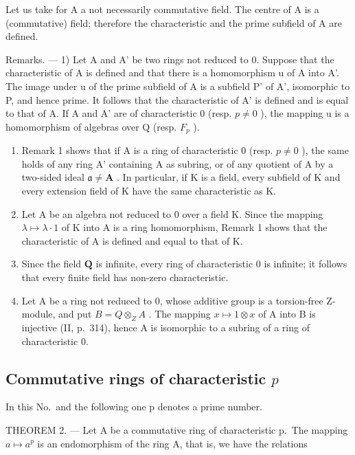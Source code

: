 Let us take for A a not necessarily commutative field. The centre of A is a (commutative) field; therefore the characteristic and the prime subfield of A are defined.

Remarks. --- 1) Let A and A' be two rings not reduced to 0. Suppose that the characteristic of A is defined and that there is a homomorphism u of A into A'. The image under u of the prime subfield of A is a subfield P' of A', isomorphic to P, and hence prime. It follows that the characteristic of A' is defined and is equal to that of A. If A and A' are of characteristic 0 (resp. \(p \neq 0\) ), the mapping u is a homomorphism of algebras over Q (resp. \(F_{p}\) ).

\begin{enumerate}
\def\labelenumi{\arabic{enumi})}
\setcounter{enumi}{1}
\item
  Remark 1 shows that if A is a ring of characteristic 0 (resp. \(p \neq 0\) ), the same holds of any ring A' containing A as subring, or of any quotient of A by a two-sided ideal \(\mathfrak{a} \neq \mathbf{A}\) . In particular, if K is a field, every subfield of K and every extension field of K have the same characteristic as K.
\item
  Let A be an algebra not reduced to 0 over a field K. Since the mapping \(\lambda \mapsto \lambda \cdot 1\) of K into A is a ring homomorphism, Remark 1 shows that the characteristic of A is defined and equal to that of K.
\item
  Since the field \(\mathbf{Q}\) is infinite, every ring of characteristic 0 is infinite; it follows that every finite field has non-zero characteristic.
\item
  Let A be a ring not reduced to 0, whose additive group is a torsion-free Z-module, and put \(B = Q \otimes_{Z} A\) . The mapping \(x \mapsto 1 \otimes x\) of A into B is injective (II, p.~314), hence A is isomorphic to a subring of a ring of characteristic 0.
\end{enumerate}

\subsection{\texorpdfstring{Commutative rings of characteristic \(p\)}{Commutative rings of characteristic p}}

In this No.~and the following one p denotes a prime number.

THEOREM 2. --- Let A be a commutative ring of characteristic p.~The mapping \(a \mapsto a^{p}\) is an endomorphism of the ring A, that is, we have the relations


